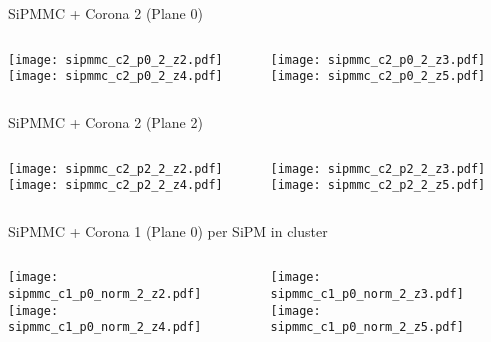 \documentclass{beamer}
\begin{document}
\begin{frame}{SiPMMC + Corona 2 (Plane 0)}
	\begin{columns}[onlytextwidth]
		\begin{column}{0.5\textwidth}
			\texttt{[image: sipmmc\_c2\_p0\_2\_z2.pdf]} \\
			\texttt{[image: sipmmc\_c2\_p0\_2\_z4.pdf]}
		 \end{column}
		 \begin{column}{0.5\textwidth}
			\texttt{[image: sipmmc\_c2\_p0\_2\_z3.pdf]} \\
			\texttt{[image: sipmmc\_c2\_p0\_2\_z5.pdf]}
		 \end{column}
 \end{columns}
\end{frame}

\begin{frame}{SiPMMC + Corona 2 (Plane 2)}
	\begin{columns}[onlytextwidth]
		\begin{column}{0.5\textwidth}
			\texttt{[image: sipmmc\_c2\_p2\_2\_z2.pdf]} \\
			\texttt{[image: sipmmc\_c2\_p2\_2\_z4.pdf]}
		 \end{column}
		 \begin{column}{0.5\textwidth}
			\texttt{[image: sipmmc\_c2\_p2\_2\_z3.pdf]} \\
			\texttt{[image: sipmmc\_c2\_p2\_2\_z5.pdf]}
		 \end{column}
 \end{columns}
\end{frame}

\begin{frame}{SiPMMC + Corona 1 (Plane 0) per SiPM in cluster}
	\begin{columns}[onlytextwidth]
		\begin{column}{0.5\textwidth}
			\texttt{[image: sipmmc\_c1\_p0\_norm\_2\_z2.pdf]} \\
			\texttt{[image: sipmmc\_c1\_p0\_norm\_2\_z4.pdf]}
		 \end{column}
		 \begin{column}{0.5\textwidth}
			\texttt{[image: sipmmc\_c1\_p0\_norm\_2\_z3.pdf]} \\
			\texttt{[image: sipmmc\_c1\_p0\_norm\_2\_z5.pdf]}
		 \end{column}
 \end{columns}
\end{frame}
\end{document}
